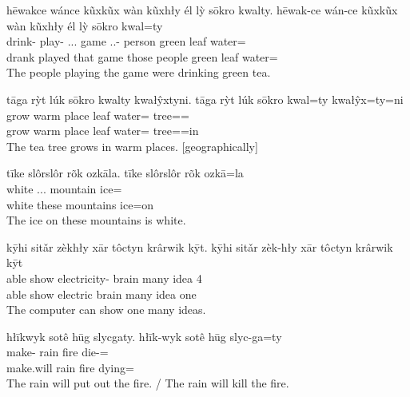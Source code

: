 \begin{exe}
    \ex
    hēwakce wánce kũxkũx wàn kũxhły él lỳ sōkro kwalty.
    \glll
    hēwak-ce wán-ce kũxkũx wàn kũxhły él lỳ sōkro kwal=ty \\
    drink-\Pst{} play-\Pst{} \Dem{}.\Anim{}.\Dist{}.\Pl{} game \Dem{}.\Anim{}.\Dist{}-\Adj{} person green leaf water=\Poss{} \\
    drank played that game those people green leaf water=\Poss{} \\
    \glt
    The people playing the game were drinking green tea.
\end{exe}

\begin{exe}
    \ex
    tāga rỳt lúk sōkro kwalty kwałŷxtyni.
    \glll
    tāga rỳt lúk sōkro kwal=ty kwałŷx=ty=ni \\
    grow warm place leaf water=\Poss{} tree=\Poss{}=\InessTwo{} \\
    grow warm place leaf water=\Poss{} tree=\Poss{}=in \\
    \glt
    The tea tree grows in warm places.
    [geographically]
\end{exe}

\begin{exe}
    \ex
    tīke slôrslôr rõk ozkāla.
    \glll
    tīke slôrslôr rõk ozkā=la \\
    white \Dem{}.\Inanim{}.\Prox{}.\Pl{} mountain ice=\AdessThree{} \\
    white these mountains ice=on \\
    \glt
    The ice on these mountains is white.
\end{exe}

\begin{exe}
    \ex
    kȳhi sitǎr zèkhły xār tôctyn krârwik kȳt.
    \glll
    kȳhi sitǎr zèk-hły xār tôctyn krârwik kȳt \\
    able show electricity-\Adj{} brain many idea 4\Sg{} \\
    able show electric brain many idea one \\
    \glt
    The computer can show one many ideas.
\end{exe}

\begin{exe}
    \ex
    hłīkwyk sotê hūg slycgaty.
    \glll
    hłīk-wyk sotê hūg slyc-ga=ty \\
    make-\Fut{} rain fire die-\Ger{}=\Poss{} \\
    make.will rain fire dying=\Poss{} \\
    \glt
    The rain will put out the fire.
    /
    The rain will kill the fire.
\end{exe}

